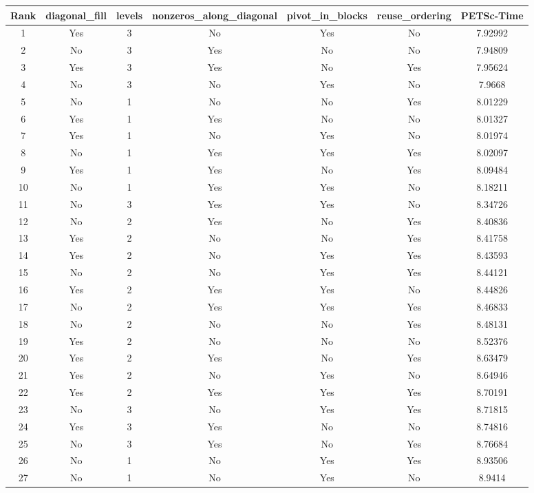 \begin{table}[h]
  \tiny
  \centering
  \begin{tabular}{ccccccc}
    \hline Rank &  diagonal\_fill & levels & nonzeros\_along\_diagonal & pivot\_in\_blocks & reuse\_ordering  & PETSc-Time\\ \hline
    1 & Yes & 3 & No & Yes & No & 7.92992 \\
    2 & No & 3 & Yes & No & No & 7.94809 \\
    3 & Yes & 3 & Yes & No & Yes & 7.95624 \\
    4 & No & 3 & No & Yes & No & 7.9668 \\
    5 & No & 1 & No & No & Yes & 8.01229 \\
    6 & Yes & 1 & Yes & No & No & 8.01327 \\
    7 & Yes & 1 & No & Yes & No & 8.01974 \\
    8 & No & 1 & Yes & Yes & Yes & 8.02097 \\
    9 & Yes & 1 & Yes & No & Yes & 8.09484 \\
    10 & No & 1 & Yes & Yes & No & 8.18211 \\
    11 & No & 3 & Yes & Yes & No & 8.34726 \\
    12 & No & 2 & Yes & No & Yes & 8.40836 \\
    13 & Yes & 2 & No & No & Yes & 8.41758 \\
    14 & Yes & 2 & No & Yes & Yes & 8.43593 \\
    15 & No & 2 & No & Yes & Yes & 8.44121 \\
    16 & Yes & 2 & Yes & Yes & No & 8.44826 \\
    17 & No & 2 & Yes & Yes & Yes & 8.46833 \\
    18 & No & 2 & No & No & Yes & 8.48131 \\
    19 & Yes & 2 & No & No & No & 8.52376 \\
    20 & Yes & 2 & Yes & No & Yes & 8.63479 \\
    21 & Yes & 2 & No & Yes & No & 8.64946 \\
    22 & Yes & 2 & Yes & Yes & Yes & 8.70191 \\
    23 & No & 3 & No & Yes & Yes & 8.71815 \\
    24 & Yes & 3 & Yes & No & No & 8.74816 \\
    25 & No & 3 & Yes & No & Yes & 8.76684 \\
    26 & No & 1 & No & Yes & Yes & 8.93506 \\
    27 & No & 1 & No & Yes & No & 8.9414 \\

\end{tabular}
\end{table}
